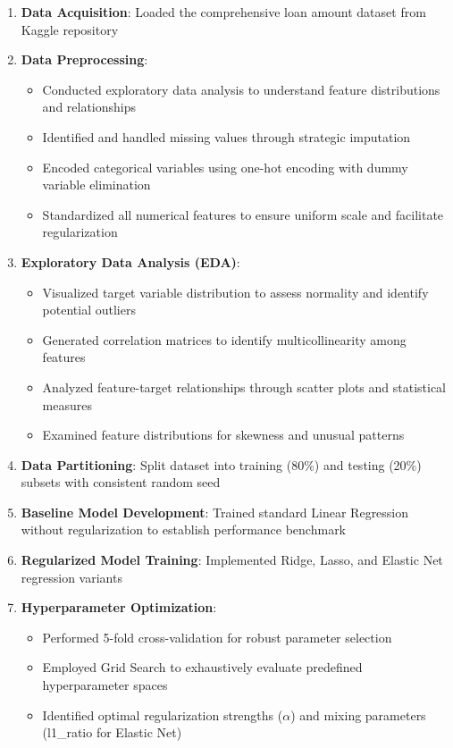 \documentclass[11pt]{article}
\begin{document}
\begin{enumerate}[label=\arabic*.]
\item \textbf{Data Acquisition}: Loaded the comprehensive loan amount dataset from Kaggle repository

\item \textbf{Data Preprocessing}:
\begin{itemize}
\item Conducted exploratory data analysis to understand feature distributions and relationships
\item Identified and handled missing values through strategic imputation
\item Encoded categorical variables using one-hot encoding with dummy variable elimination
\item Standardized all numerical features to ensure uniform scale and facilitate regularization
\end{itemize}

\item \textbf{Exploratory Data Analysis (EDA)}:
\begin{itemize}
\item Visualized target variable distribution to assess normality and identify potential outliers
\item Generated correlation matrices to identify multicollinearity among features
\item Analyzed feature-target relationships through scatter plots and statistical measures
\item Examined feature distributions for skewness and unusual patterns
\end{itemize}

\item \textbf{Data Partitioning}: Split dataset into training (80\%) and testing (20\%) subsets with consistent random seed

\item \textbf{Baseline Model Development}: Trained standard Linear Regression without regularization to establish performance benchmark

\item \textbf{Regularized Model Training}: Implemented Ridge, Lasso, and Elastic Net regression variants

\item \textbf{Hyperparameter Optimization}:
\begin{itemize}
\item Performed 5-fold cross-validation for robust parameter selection
\item Employed Grid Search to exhaustively evaluate predefined hyperparameter spaces
\item Identified optimal regularization strengths ($\alpha$) and mixing parameters (l1\_ratio for Elastic Net)
\end{itemize}


\end{enumerate}
\end{document}
